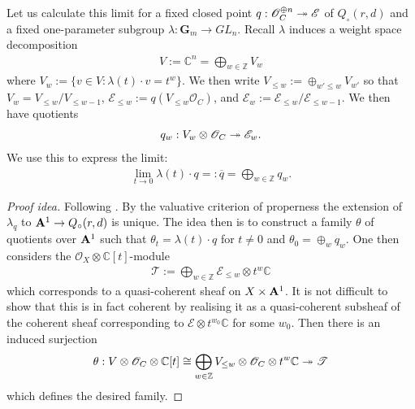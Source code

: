 \documentclass[12pt]{ociamthesis}  %
\begin{document}
\begin{example}\label{ex:lf_limits}
  Let us calculate this limit for a fixed closed point
  $q : \mathscr O^{\oplus n}_C \twoheadrightarrow \mathscr E$ of $Q_\circ(r,d)$
  and a fixed one-parameter subgroup $\lambda : \mathbf G_m \to GL_n$.
  Recall $\lambda$ induces a weight space decomposition
  \begin{align*}
    V := \mathbb C^n  = \bigoplus_{w\in\mathbb Z} V_w
  \end{align*}
  where $V_w := \{v \in V : \lambda(t)\cdot v = t^w\}$. We then
  write $V_{\leq w} := \oplus_{w'\leq w}V_{w'}$ so that $V_w = V_{\leq w}/V_{\leq w-1}$,
  $\mathscr E_{\leq w} := q(V_{\leq w}\mathscr O_C)$, and
  $\mathscr E_w := \mathscr E_{\leq w}/\mathscr E_{\leq w-1}$.
  We then have quotients
  \begin{align*}
    q_w : V_w\otimes\mathscr O_C \twoheadrightarrow \mathscr E_w.
  \end{align*}
  We use this to express the limit:
  \begin{align*}
    \lim_{t\to 0} \lambda(t)\cdot q =: \overline{q} = \bigoplus_{w\in\mathbb Z} q_w.
  \end{align*}
  \begin{proof}[Proof idea]
    Following \cite[Lemma 4.4.3]{huybrechts2010}.
    By the valuative criterion of properness the extension
    of $\lambda_q$ to $\mathbf{A}^{1}_{}\to Q_\circ(r,d)$ is unique.
    The idea then is to construct a family $\theta$
    of quotients over $\mathbf{A}^{1}_{}$ such that $\theta_t = \lambda(t)\cdot q$
    for $t\neq 0$ and $\theta_0 = \oplus_w q_w$.
    One then considers the $\mathscr O_X\otimes\mathbb C[t]$-module
    \begin{align*}
      \mathscr T := \bigoplus_{w\in\mathbb Z} \mathscr E_{\leq w}\otimes t^w\mathbb C
    \end{align*}
    which corresponds to a quasi-coherent sheaf on $X\times\mathbf{A}^{1}_{}$.
    It is not difficult to show that this is in fact coherent by
    realising it as a quasi-coherent subsheaf of the coherent sheaf
    corresponding to $\mathscr E\otimes t^{w_0}\mathbb C$ for some $w_0$.
    Then there is an induced surjection
    \begin{align}\label{eq:lf_extension}
      \theta : V\otimes\mathscr O_C \otimes \mathbb C[t]
      \cong\bigoplus_{w\in\mathbb Z} V_{\leq w}\otimes\mathscr O_C\otimes t^w\mathbb C
      \twoheadrightarrow \mathscr T
    \end{align}
    which defines the desired family.
  \end{proof}
\end{example}
\end{document}
